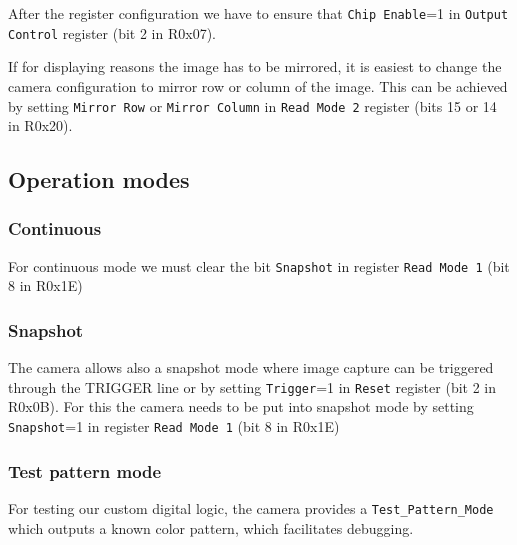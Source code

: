\documentclass{article}
\begin{document}
After the register configuration we have to ensure that \verb'Chip Enable'=1 in \verb'Output Control' register (bit 2 in R0x07).


If for displaying reasons the image has to be mirrored, it is easiest to change the camera configuration to mirror row or column of the image.
This can be achieved by setting \verb'Mirror Row' or \verb'Mirror Column' in \verb'Read Mode 2' register (bits 15 or 14 in R0x20).

\subsection{Operation modes}
\subsubsection{Continuous}
For continuous mode we must clear the bit \verb'Snapshot' in register \verb'Read Mode 1' (bit 8 in R0x1E)

\subsubsection{Snapshot}
The camera allows also a snapshot mode where image capture can be triggered through the TRIGGER line or by setting \verb'Trigger'=1 in \verb'Reset' register (bit 2 in R0x0B).
For this the camera needs to be put into snapshot mode by setting \verb'Snapshot'=1 in register \verb'Read Mode 1' (bit 8 in R0x1E)

\subsubsection{Test pattern mode}
For testing our custom digital logic, the camera provides a \verb'Test_Pattern_Mode' which outputs a known color pattern, which facilitates debugging.
\end{document}
